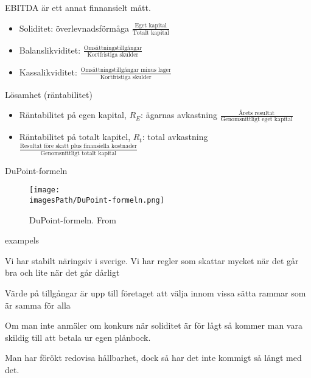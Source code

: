 EBITDA är ett annat finnansielt mått.

\begin{itemize} %
    \item Soliditet: överlevnadsförmåga \newline
    $\frac{\text{Eget kapital}}{\text{Totalt kapital}}$
    \item Balanslikviditet: \newline 
    $\frac{\text{Omsättningstillgångar}}{\text{Kortfristiga skulder}}$
    \item Kassalikviditet: \newline
    $\frac{\text{Omsättningstillgångar minus lager}}{\text{Kortfristiga skulder}}$
\end{itemize}

Lösamhet (räntabilitet)
\begin{itemize}
    \item Räntabilitet på egen kapital, $R_E$: ägarnas avkastning \newline
    $\frac{\text{Årets resultat}}{\text{Genomsnittligt eget kapital}}$
    \item Räntabilitet på totalt kapitel, $R_t$: total avkastning \newline
    $\frac{\text{Resultat före skatt plus finansiella kostnader}}{\text{Genomsnittligt totalt kapital}}$
\end{itemize}

DuPoint-formeln
\begin{figure}[!ht]
    \centering
    \texttt{[image: \\imagesPath/DuPoint-formeln.png]}
    \caption{DuPoint-formeln. From \cite{}}
\end{figure}

exampels %


Vi har stabilt näringsiv i sverige. Vi har regler som skattar mycket när det går bra 
och lite när det går dårligt 

Värde på tillgångar är upp till företaget att välja innom vissa sätta rammar som är samma för alla

Om man inte anmäler om konkurs när soliditet är för lågt så kommer man vara skildig till 
att betala ur egen plånbock. 


Man har förökt redovisa hållbarhet, dock så har det inte kommigt så långt med det.


